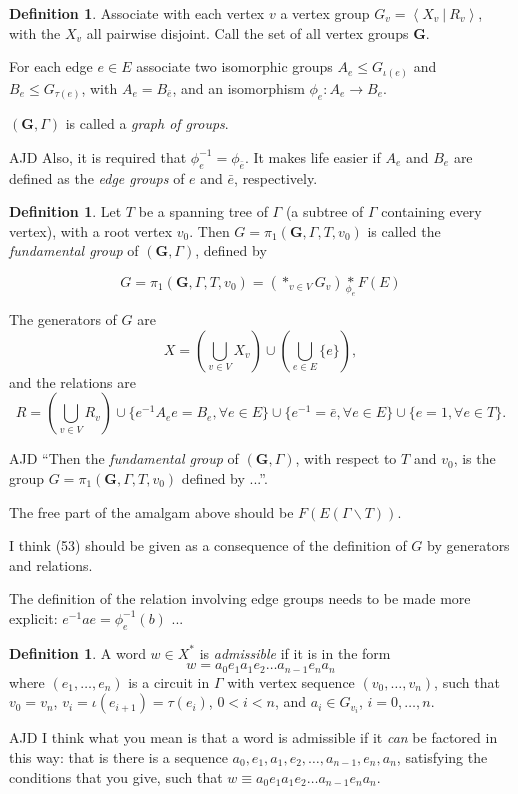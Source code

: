 \documentclass[a4paper]{article}
\newcommand{\present}[2]{\left \langle #1 \: | \: #2 \right \rangle}	%
\newcommand{\fgoagog}{\pi_1(\mathbf{G},\Gamma,T,v_0)}					%
\theoremstyle{plain}
\theoremstyle{definition}
\newtheorem{definition}[theorem]{Definition}
\newenvironment{ad}{\noindent\color{green} AJD }{}
\newcommand{\ajd}[1]{
\begin{ad} #1 \end{ad}}
\begin{document}
\begin{definition}
Associate with each vertex $v$ a vertex group $G_v = \present{X_v}{R_v}$, with the $X_v$ all pairwise disjoint. Call the set of all vertex groups $\mathbf{G}$. 

For each edge $e \in E$ associate two isomorphic groups $A_e \leq G_{\iota(e)}$ and $B_e \leq G_{\tau(e)}$, with $A_e = B_{\bar{e}}$, and an isomorphism $\phi_e : A_e \rightarrow B_e$.

$(\mathbf{G},\Gamma)$ is called a {\it graph of groups}.
\end{definition}
\ajd{Also, it is required that  $\phi_e^{-1}=\phi_{\bar e}$. 
It makes life easier if $A_e$ and $B_e$ are defined as the 
{\em edge groups} of $e$ and $\bar e$, respectively.}
\begin{definition}
Let $T$ be a spanning tree of $\Gamma$ (a subtree of $\Gamma$ containing every vertex), with a root vertex $v_0$. Then $G = \fgoagog$ is called the {\it fundamental group} of $(\mathbf{G},\Gamma)$, defined by

\begin{equation}
G = \fgoagog = \left( \ast_{v \in V} G_v \right) \underset{\phi_e}{\ast} F(E)
\end{equation}

The generators of $G$ are
\[ X = \left( \bigcup_{v \in V}X_v \right) \cup \left( \bigcup_{e \in E}\{e\} \right),\]
and the relations are 
\[ R = \left( \bigcup_{v \in V}R_v \right) \cup \{e^{-1}A_ee = B_e,  \forall e \in E\} \cup \{ e^{-1} = \bar{e}, \forall e \in E\} \cup \{ e = 1, \forall e \in T \}.\]
\end{definition}
\ajd{``Then the {\it fundamental group} of $(\mathbf{G},\Gamma)$, with
respect to $T$ and $v_0$,  is the
group  $G = \fgoagog$ defined by ...''. 

The free part of the amalgam above
should be $F(E(\Gamma \backslash T))$. 

I think (53) should be given as
a consequence of the definition of $G$ by generators and relations. 

The
definition of the relation involving edge groups needs to be made
more explicit: $e^{-1}ae=\phi_e^{-1}(b)$ ...}
\begin{definition}
A word $w \in X^{\ast}$ is {\it admissible} if it is in the form
\[ w = a_0 e_1 a_1 e_2 \dots a_{n-1} e_n a_n \]
where $(e_1,\dots,e_n)$ is a circuit in $\Gamma$ with vertex sequence $(v_0,\dots,v_n)$, such that $v_0 = v_n$, $v_i = \iota(e_{i+1})=\tau(e_i)$, $0 < i < n$, and $a_i \in G_{v_i}$, $i=0,\dots,n$.
\end{definition}
\ajd{I think what you mean is that a word is admissible if it {\em can}
be factored in this way: that is there is a sequence 
$ a_0, e_1, a_1, e_2 ,\dots ,a_{n-1}, e_n, a_n$, satisfying the conditions
that you give, such that $w\equiv   a_0 e_1 a_1 e_2 \dots a_{n-1} e_n a_n $.}
\end{document}
